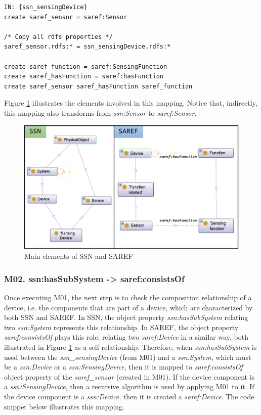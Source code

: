 \documentclass{sig-alternate-05-2015}
\begin{document}
\begin{lstlisting}[caption={Pseudocode snippet for M01},label={code:sample}]
IN: {ssn_sensingDevice}  
create saref_sensor = saref:Sensor  

/* Copy all rdfs properties */ 
saref_sensor.rdfs:* = ssn_sensingDevice.rdfs:*
    
create saref_function = saref:SensingFunction  
create saref_hasFunction = saref:hasFunction  
create saref_sensor saref_hasFunction saref_function  

\end{lstlisting}

Figure \ref{fig:SSN_SAREF_SensingDevice_Device} illustrates the elements involved in this mapping. Notice that, indirectly, this mapping also transforms from \textit{ssn:Sensor} to \textit{saref:Sensor}.

\begin{figure}[h!]
\centering
\includegraphics[scale=0.28]{SSN_SAREF_SensingDevice_Device}
\caption{Main elements of SSN and SAREF}
\label{fig:SSN_SAREF_SensingDevice_Device}
\end{figure}

\subsubsection{M02. ssn:hasSubSystem -> saref:consistsOf}
Once executing M01, the next step is to check the composition relationship of a device, i.e. the components that are part of a device, which are characterized by both SSN and SAREF. In SSN, the object property \textit{ssn:hasSubSystem} relating two \textit{ssn:System} represents this relationship. In SAREF, the object property \textit{saref:consistsOf} plays this role, relating two \textit{saref:Device} in a similar way, both illustrated in Figure \ref{fig:SSN_SAREF_SensingDevice_Device} as a self-relationship. Therefore, when \textit{ssn:hasSubSystem} is used between the \textit{ssn\_sensingDevice} (from M01) and a \textit{ssn:System}, which must be a \textit{ssn:Device} or a \textit{ssn:SensingDevice}, then it is mapped to \textit{saref:consistsOf} object property of the \textit{saref\_sensor} (created in M01). If the device component is a \textit{ssn:SensingDevice}, then a recursive algorithm is used by applying M01 to it. If the device component is a \textit{ssn:Device}, then it is created a \textit{saref:Device}. The code snippet below illustrates this mapping.
\end{document}
